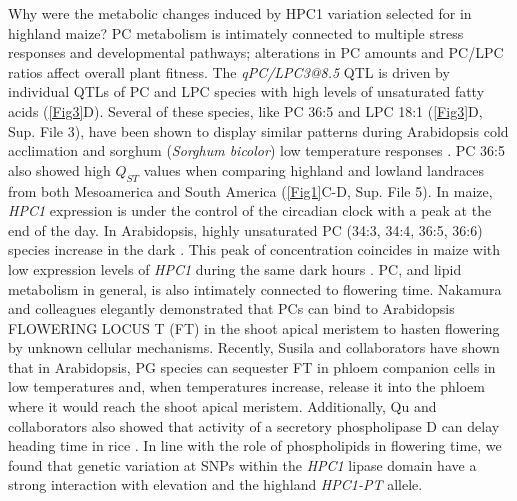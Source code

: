 \documentclass[9pt,twocolumn,twoside,lineno]{biorxiv}
\newcommand{\hpc}{\textit{HPC1}\xspace}
\begin{document}
Why were the metabolic changes induced by HPC1 variation selected for in highland maize?
PC metabolism is intimately connected to multiple stress responses and developmental pathways; alterations in PC amounts and PC/LPC ratios affect overall plant fitness.
The \textit{qPC/LPC3@8.5} QTL is driven by individual QTLs of PC and LPC species with high levels of unsaturated fatty acids (\cref{Fig3}D).
Several of these species, like PC 36:5 and LPC 18:1 (\cref{Fig3}D, Sup. File 3), have been shown to display similar patterns during Arabidopsis cold acclimation \cite{Welti2002-uk} and sorghum (\textit{Sorghum bicolor}) low temperature responses \cite{Marla2017-ph}.
PC 36:5 also showed high $Q_{ST}$ values when comparing highland and lowland landraces from both Mesoamerica and South America (\cref{Fig1}C-D, Sup. File 5).
In maize, \hpc expression is under the control of the circadian clock \cite{Khan2010-iv} with a peak at the end of the day. 
In Arabidopsis, highly unsaturated PC (34:3, 34:4, 36:5, 36:6) species increase in the dark \cite{Maatta2012-ip}. 
This peak of concentration coincides in maize with low expression levels of \hpc during the same dark hours \cite{Khan2010-iv}.
PC, and lipid metabolism in general, is also intimately connected to flowering time. 
Nakamura and colleagues elegantly demonstrated that PCs can bind to Arabidopsis FLOWERING LOCUS T (FT) in the shoot apical meristem to hasten flowering \cite{Nakamura2014-qf, Nakamura2019-ht} by unknown cellular mechanisms. 
Recently, Susila and collaborators have shown that in Arabidopsis, PG species can sequester FT in phloem companion cells in low temperatures \cite{Susila2021-dz} and, when temperatures increase, release it into the phloem where it would reach the shoot apical meristem.   
Additionally, Qu and collaborators also showed that activity of a secretory phospholipase D can delay heading time in rice \cite{Qu2021-wc}.
In line with the role of phospholipids in flowering time, we found that genetic variation at SNPs within the  \hpc lipase domain have a strong interaction with elevation and the highland \textit{HPC1-PT} allele. 
\end{document}
